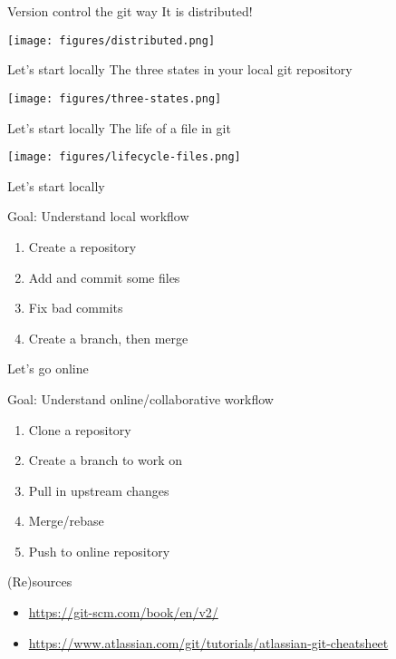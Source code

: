 \documentclass[presentation,aspectratio=1610]{beamer}
\begin{document}
\begin{frame}[label={sec:orgf4c1227}]{Version control the git way}
It is \alert{distributed}!

\begin{center}
\texttt{[image: figures/distributed.png]}
\end{center}
\end{frame}


\begin{frame}[label={sec:org1991fac}]{Let's start locally}
The three states in your local \alert{git} repository

\begin{center}
\texttt{[image: figures/three-states.png]}
\end{center}
\end{frame}
\begin{frame}[label={sec:org2f6dfe6}]{Let's start locally}
The life of a file in \alert{git}

\begin{center}
\texttt{[image: figures/lifecycle-files.png]}
\end{center}
\end{frame}
\begin{frame}[label={sec:org077f6c1}]{Let's start locally}
\begin{block}{Goal: Understand local workflow}
\begin{enumerate}
\item Create a repository
\item Add and commit some files
\item Fix bad commits
\item Create a branch, then merge
\end{enumerate}
\end{block}
\end{frame}


\begin{frame}[label={sec:orga21a689}]{Let's go online}
\begin{block}{Goal: Understand online/collaborative workflow}
\begin{enumerate}
\item Clone a repository
\item Create a branch to work on
\item Pull in upstream changes
\item Merge/rebase
\item Push to online repository
\end{enumerate}
\end{block}
\end{frame}

\begin{frame}[label={sec:org8002f9d}]{(Re)sources}
\begin{itemize}
\item \url{https://git-scm.com/book/en/v2/}
\item \url{https://www.atlassian.com/git/tutorials/atlassian-git-cheatsheet}
\end{itemize}
\end{frame}
\end{document}
